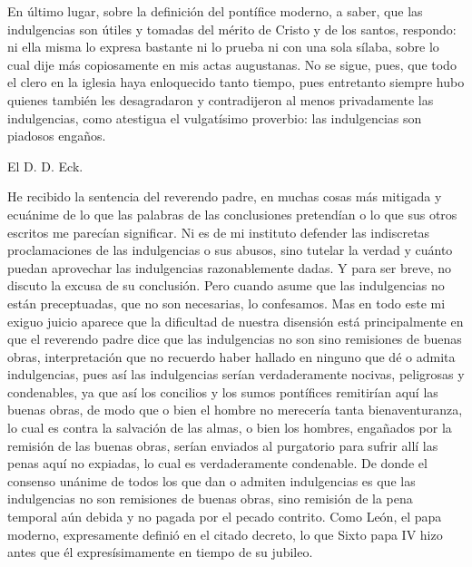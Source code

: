 En último lugar, sobre la definición del pontífice moderno, a saber, que las indulgencias son útiles y tomadas del mérito de Cristo y de los santos, respondo: ni ella misma lo expresa bastante ni lo prueba ni con una sola sílaba, sobre lo cual dije más copiosamente en mis actas augustanas. No se sigue, pues, que todo el clero en la iglesia haya enloquecido tanto tiempo, pues entretanto siempre hubo quienes también les desagradaron y contradijeron al menos privadamente las indulgencias, como atestigua el vulgatísimo proverbio: las indulgencias son piadosos engaños.

El D. D. Eck.

He recibido la sentencia del reverendo padre, en muchas cosas más mitigada y ecuánime de lo que las palabras de las conclusiones pretendían o lo que sus otros escritos me parecían significar. Ni es de mi instituto defender las indiscretas proclamaciones de las indulgencias o sus abusos, sino tutelar la verdad y cuánto puedan aprovechar las indulgencias razonablemente dadas. Y para ser breve, no discuto la excusa de su conclusión. Pero cuando asume que las indulgencias no están preceptuadas, que no son necesarias, lo confesamos. Mas en todo este mi exiguo juicio aparece que la dificultad de nuestra disensión está principalmente en que el reverendo padre dice que las indulgencias no son sino remisiones de buenas obras, interpretación que no recuerdo haber hallado en ninguno que dé o admita indulgencias, pues así las indulgencias serían verdaderamente nocivas, peligrosas y condenables, ya que así los concilios y los sumos pontífices remitirían aquí las buenas obras, de modo que o bien el hombre no merecería tanta bienaventuranza, lo cual es contra la salvación de las almas, o bien los hombres, engañados por la remisión de las buenas obras, serían enviados al purgatorio para sufrir allí las penas aquí no expiadas, lo cual es verdaderamente condenable. De donde el consenso unánime de todos los que dan o admiten indulgencias es que las indulgencias no son remisiones de buenas obras, sino remisión de la pena temporal aún debida y no pagada por el pecado contrito. Como León, el papa moderno, expresamente definió en el citado decreto, lo que Sixto papa IV hizo antes que él expresísimamente en tiempo de su jubileo.

